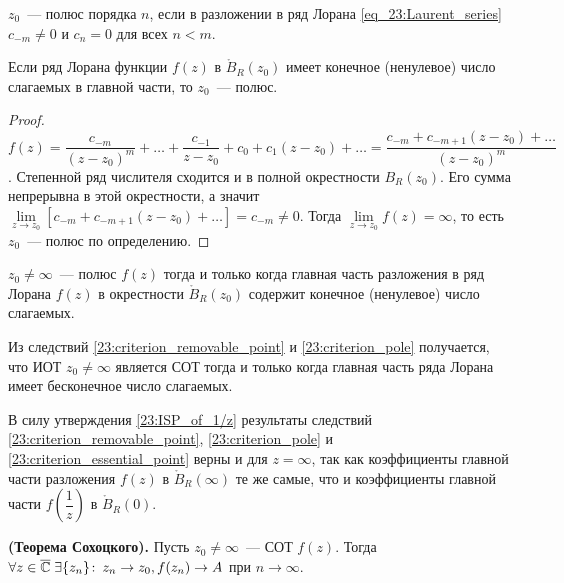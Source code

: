 \begin{definition}
\(z_0\)~--- полюс порядка \(n\), если в разложении в ряд Лорана \ref{eq_23:Laurent_series}
\(c_{-m} \ne 0\) и \(c_n = 0\) для всех \(n < m\).
\end{definition}

\begin{statement}
Если ряд Лорана функции \(f(z)\) в \(\mathring{B}_R(z_0)\) имеет конечное (ненулевое) число
слагаемых в главной части, то \(z_0\)~--- полюс.
\end{statement}

\begin{proof}
\(f(z) = \dfrac{c_{-m}}{(z-z_0)^m} + \dots + \dfrac{c_{-1}}{z-z_0} + c_0 + c_1 (z - z_0) + \dots =
\dfrac{c_{-m} + c_{-m+1}(z-z_0) + \dots}{(z - z_0)^m}\). Степенной ряд числителя сходится и в полной
 окрестности \(B_R(z_0)\). Его сумма непрерывна в этой окрестности, а значит
\(\lim\limits_{z \to z_0} [c_{-m} + c_{-m +1} (z-z_0) + \dots] = c_{-m} \ne 0\). Тогда
\(\lim\limits_{z \to z_0} f(z) = \infty\), то есть \(z_0\)~--- полюс по определению.
\end{proof}

\begin{corollary} \label{23:criterion_pole}
\(z_0 \ne \infty\)~--- полюс \(f(z)\) тогда и только когда главная часть разложения в ряд Лорана
\(f(z)\) в окрестности \(\mathring{B}_R(z_0)\) содержит конечное (ненулевое) число слагаемых.
\end{corollary}

\begin{corollary} \label{23:criterion_essential_point}
Из следствий \ref{23:criterion_removable_point} и \ref{23:criterion_pole} получается, что ИОТ
\(z_0 \ne \infty\) является СОТ тогда и только когда главная часть ряда Лорана имеет бесконечное
число слагаемых.
\end{corollary}

\begin{note}
В силу утверждения \ref{23:ISP_of_1/z} результаты следствий \ref{23:criterion_removable_point},
\ref{23:criterion_pole} и \ref{23:criterion_essential_point} верны и для \(z = \infty\), так как
коэффициенты главной части разложения \(f(z)\) в \(\mathring{B}_R(\infty)\) те же самые, что и
коэффициенты главной части \(f(\dfrac{1}{z})\) в \(\mathring{B}_R(0)\).
\end{note}

\begin{statement}
\textbf{(Теорема Сохоцкого).} Пусть \(z_0 \ne \infty\)~--- СОТ \(f(z)\). Тогда \(\forall z \in \overline{\mathbb{C}}
\; \exists \{z_n\}\colon \, z_n \to z_0, f(z_n) \to A\) при \(n \to \infty\).
\end{statement}

